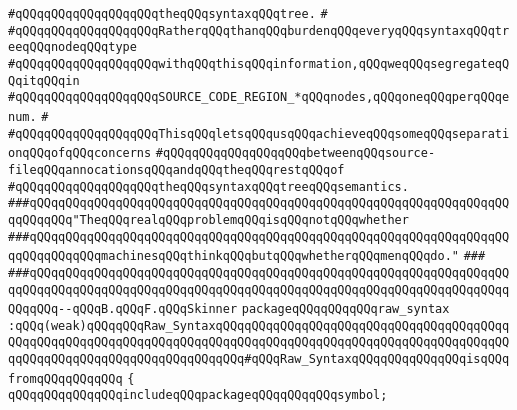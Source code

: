 \verb|#qQQqqQQqqQQqqQQqqQQqtheqQQqsyntaxqQQqtree.|\newline
\verb|#|\newline
\verb|#qQQqqQQqqQQqqQQqqQQqRatherqQQqthanqQQqburdenqQQqeveryqQQqsyntaxqQQqtreeqQQqnodeqQQqtype|\newline
\verb|#qQQqqQQqqQQqqQQqqQQqwithqQQqthisqQQqinformation,qQQqweqQQqsegregateqQQqitqQQqin|\newline
\verb|#qQQqqQQqqQQqqQQqqQQqSOURCE_CODE_REGION_*qQQqnodes,qQQqoneqQQqperqQQqenum.|\newline
\verb|#|\newline
\verb|#qQQqqQQqqQQqqQQqqQQqThisqQQqletsqQQqusqQQqachieveqQQqsomeqQQqseparationqQQqofqQQqconcerns|\newline
\verb|#qQQqqQQqqQQqqQQqqQQqbetweenqQQqsource-fileqQQqannocationsqQQqandqQQqtheqQQqrestqQQqof|\newline
\verb|#qQQqqQQqqQQqqQQqqQQqtheqQQqsyntaxqQQqtreeqQQqsemantics.|\newline
\newline
\newline
\newline
\verb|###qQQqqQQqqQQqqQQqqQQqqQQqqQQqqQQqqQQqqQQqqQQqqQQqqQQqqQQqqQQqqQQqqQQqqQQqqQQq"TheqQQqrealqQQqproblemqQQqisqQQqnotqQQqwhether|\newline
\verb|###qQQqqQQqqQQqqQQqqQQqqQQqqQQqqQQqqQQqqQQqqQQqqQQqqQQqqQQqqQQqqQQqqQQqqQQqqQQqqQQqmachinesqQQqthinkqQQqbutqQQqwhetherqQQqmenqQQqdo."|\newline
\verb|###|\newline
\verb|###qQQqqQQqqQQqqQQqqQQqqQQqqQQqqQQqqQQqqQQqqQQqqQQqqQQqqQQqqQQqqQQqqQQqqQQqqQQqqQQqqQQqqQQqqQQqqQQqqQQqqQQqqQQqqQQqqQQqqQQqqQQqqQQqqQQqqQQqqQQqqQQq--qQQqB.qQQqF.qQQqSkinner|\newline
\newline
\newline
\newline
\verb|packageqQQqqQQqqQQqraw_syntax|\newline
\verb|:qQQq(weak)qQQqqQQqRaw_SyntaxqQQqqQQqqQQqqQQqqQQqqQQqqQQqqQQqqQQqqQQqqQQqqQQqqQQqqQQqqQQqqQQqqQQqqQQqqQQqqQQqqQQqqQQqqQQqqQQqqQQqqQQqqQQqqQQqqQQqqQQqqQQqqQQqqQQqqQQqqQQqqQQq#qQQqRaw_SyntaxqQQqqQQqqQQqqQQqisqQQqfromqQQqqQQqqQQq|\newline
\verb|{|\newline
\verb|qQQqqQQqqQQqqQQqincludeqQQqpackageqQQqqQQqqQQqsymbol;|\newline
